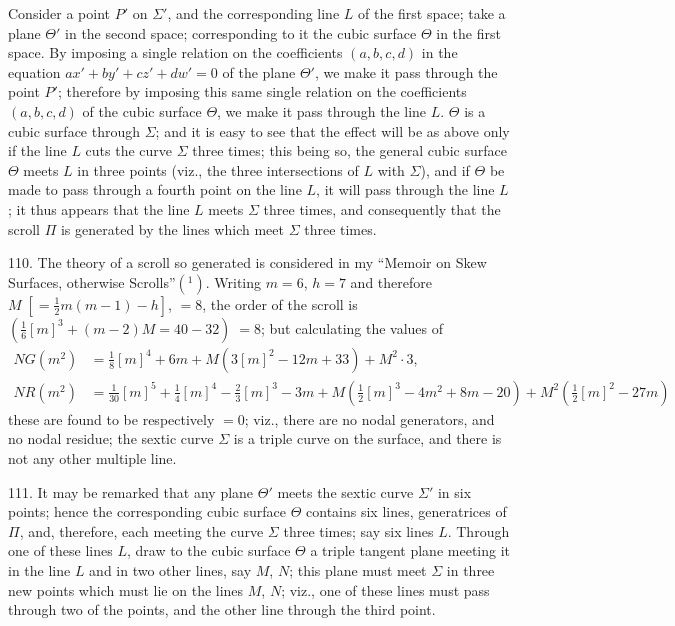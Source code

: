 \documentclass[11pt]{article}
\begin{document}
Consider a point $P'$ on $\Sigma'$, and the corresponding line $L$ of the first space; take
a plane $\Theta'$ in the second space; corresponding to it the cubic surface $\Theta$ in the first
space. By imposing a single relation on the coefficients $(a, b, c, d)$ in the equation
$ax' + by' + cz' + dw' = 0$ of the plane $\Theta'$, we make it pass through the point $P'$;
therefore by imposing this same single relation on the coefficients $(a, b, c, d)$ of the
cubic surface $\Theta$, we make it pass through the line $L$. $\Theta$ is a cubic surface through $\Sigma$;
and it is easy to see that the effect will be as above only if the line $L$ cuts the
curve $\Sigma$ three times; this being so, the general cubic surface $\Theta$ meets $L$ in three
points (viz., the three intersections of $L$ with $\Sigma$), and if $\Theta$ be made to pass through
a fourth point on the line $L$, it will pass through the line $L$; it thus appears that
the line $L$ meets $\Sigma$ three times, and consequently that the scroll $\Pi$ is generated by
the lines which meet $\Sigma$ three times.

\medskip

110. The theory of a scroll so generated is considered in my ``Memoir on Skew Surfaces,
otherwise Scrolls''$(^1)$. Writing $m = 6$, $h = 7$ and therefore $M\;[= \tfrac{1}{2}m(m-1) - h]$, $= 8$,
the order of the scroll is $(\tfrac{1}{6}[m]^3 + (m-2)M = 40 - 32)\; =8$; but calculating the values of
\begin{align*}
NG(m^2) &= \tfrac{1}{8}[m]^4 + 6m + M(3[m]^2 - 12m + 33) + M^2\cdot 3,\\
NR(m^2) &= \tfrac{1}{30}[m]^5 + \tfrac{1}{4}[m]^4 - \tfrac{2}{3}[m]^3 - 3m + M(\tfrac{1}{2}[m]^3 - 4m^2 + 8m - 20) + M^2(\tfrac{1}{2}[m]^2 - 27m)
\end{align*}
these are found to be respectively $=0$; viz., there are no nodal generators, and no
nodal residue; the sextic curve $\Sigma$ is a triple curve on the surface, and there is not
any other multiple line.

\medskip

111. It may be remarked that any plane $\Theta'$ meets the sextic curve $\Sigma'$ in six
points; hence the corresponding cubic surface $\Theta$ contains six lines, generatrices of $\Pi$,
and, therefore, each meeting the curve $\Sigma$ three times; say six lines $L$. Through one
of these lines $L$, draw to the cubic surface $\Theta$ a triple tangent plane meeting it in the
line $L$ and in two other lines, say $M$, $N$; this plane must meet $\Sigma$ in three new points
which must lie on the lines $M$, $N$; viz., one of these lines must pass through two
of the points, and the other line through the third point.
\end{document}
